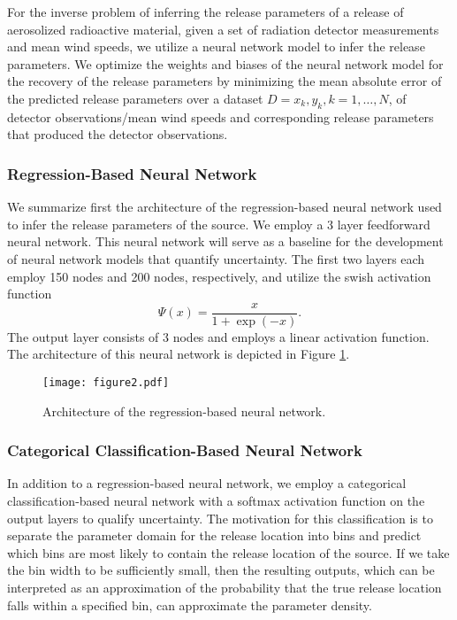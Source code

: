 \documentclass[sn-mathphys-ay]{sn-jnl}
\begin{document}
For the inverse problem of inferring the release parameters of a release of aerosolized radioactive material, given a set of radiation detector measurements and mean wind speeds, we utilize a neural network model to infer the release parameters. We optimize the weights and biases of the neural network model for the recovery of the release parameters by minimizing the mean absolute error of the predicted release parameters over a dataset $D={x_k, y_k, k=1, \dots, N}$, of detector observations/mean wind speeds and corresponding release parameters that produced the detector observations.\\

\subsubsection{Regression-Based Neural Network}
We summarize first the architecture of the regression-based neural network used to infer the release parameters of the source. We employ a 3 layer feedforward neural network. This neural network will serve as a baseline for the development of neural network models that quantify uncertainty. The first two layers each employ 150 nodes and 200 nodes, respectively, and utilize the swish activation function
\begin{equation}
\label{eq:swish2}
\Psi(x)=\frac{x}{1+\exp(-x)}.
\end{equation} 
The output layer consists of 3 nodes and employs a linear activation function. The architecture of this neural network is depicted in Figure \ref{fig:NN_diagram}. \\

\begin{figure}[!ht]
\centering
\texttt{[image: figure2.pdf]}
 \caption{Architecture of the regression-based neural network.}
 \label{fig:NN_diagram}
  \end{figure}

\subsubsection{Categorical Classification-Based Neural Network}
In addition to a regression-based neural network, we employ a categorical classification-based neural network with a softmax activation function on the output layers to qualify uncertainty. The motivation for this classification is to separate the parameter domain for the release location into bins and predict which bins are most likely to contain the release location of the source. If we take the bin width to be sufficiently small, then the resulting outputs, which can be interpreted as an approximation of the probability that the true release location falls within a specified bin, can approximate the parameter density. 
\end{document}

